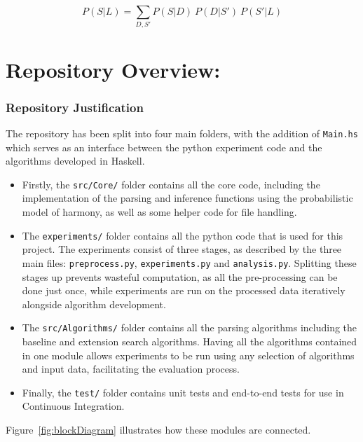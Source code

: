 \documentclass[12pt,a4paper,twoside,openright]{report}
\theoremstyle{definition}
\begin{document}
\begin{equation}
  P(S|L) = \sum\limits_{D,S'} P(S|D)~P(D|S')~P(S'|L)
  \label{eq:inferencePVEQ}
\end{equation}
\section{Repository Overview:}

\subsubsection{Repository Justification}

The repository has been split into four main folders, with the addition of \texttt{Main.hs} which serves as an interface between the python experiment code and the algorithms developed in Haskell. 
\begin{itemize}
  \item Firstly, the \texttt{src/Core/} folder contains all the core code, including the implementation of the parsing  and inference functions using the probabilistic model of harmony, as well as some helper code for file handling. 
  \item The \texttt{experiments/} folder contains all the python code that is used for this project. The experiments consist of three stages, as described by the three main files: \texttt{preprocess.py}, \texttt{experiments.py} and \texttt{analysis.py}. Splitting these stages up prevents wasteful computation, as all the pre-processing can be done just once, while experiments are run on the processed data iteratively alongside algorithm development. 
  \item The \texttt{src/Algorithms/} folder contains all the parsing algorithms including the baseline and extension search algorithms. Having all the algorithms contained in one module allows experiments to be run using any selection of algorithms and input data, facilitating the evaluation process.  
  \item Finally, the \texttt{test/} folder contains unit tests and end-to-end tests for use in Continuous Integration.
\end{itemize}

Figure~\ref{fig:blockDiagram} illustrates how these modules are connected. 
\end{document}

